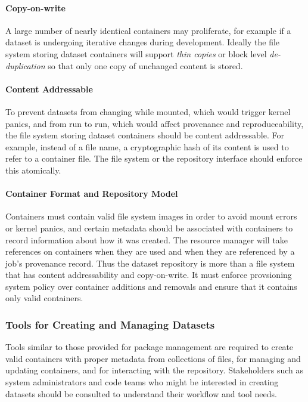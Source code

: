 \paragraph{Copy-on-write}
A large number of nearly identical containers may proliferate, for example
if a dataset is undergoing iterative changes during development.
Ideally the file system storing dataset containers will support
{\em thin copies} or block level {\em de-duplication} so that only one
copy of unchanged content is stored.

\paragraph{Content Addressable}
To prevent datasets from changing while mounted, which would trigger
kernel panics, and from run to run, which would affect provenance and
reproduceability, the file system storing dataset containers should
be content addressable.  For example, instead of a file name, a cryptographic
hash of its content is used to refer to a container file.
The file system or the repository interface should enforce this atomically.

\paragraph{Container Format and Repository Model}
Containers must contain valid file system images in order to avoid
mount errors or kernel panics, and certain metadata should be associated
with containers to record information about how it was created.
The resource manager will take references on containers when they are used
and when they are referenced by a job's provenance record.
Thus the dataset repository is more than a file system that has
content addressability and copy-on-write.
It must enforce provsioning system policy over container additions and
removals and ensure that it contains only valid containers.

\subsubsection{Tools for Creating and Managing Datasets}

Tools similar to those provided for package management are required to
create valid containers with proper metadata from collections of files,
for managing and updating containers, and for interacting with the repository.
Stakeholders such as system administrators and code teams who might
be interested in creating datasets should be consulted to understand
their workflow and tool needs.  

